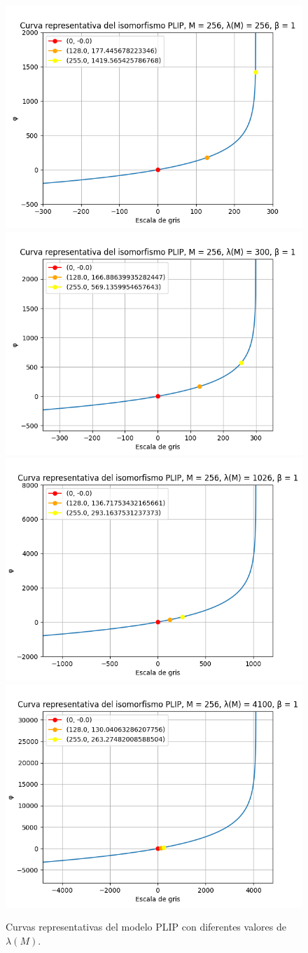\begin{figure}
	\begin{center}
		\includegraphics[width=5.5 cm]{images/plip_curves/plip_curve_256.png}
		\includegraphics[width=5.5 cm]{images/plip_curves/plip_curve_300.png}
		\includegraphics[width=5.5 cm]{images/plip_curves/plip_curve_1026.png}
		\includegraphics[width=5.5 cm]{images/plip_curves/plip_curve_4100.png}
		\caption{Curvas representativas del modelo PLIP con diferentes valores de $\lambda(M)$.}
	\end{center}
\end{figure}

